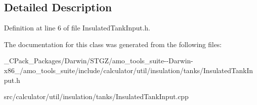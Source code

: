 \subsection{Detailed Description}


Definition at line 6 of file Insulated\+Tank\+Input.\+h.



The documentation for this class was generated from the following files\+:\begin{DoxyCompactItemize}
\item 
\+\_\+\+C\+Pack\+\_\+\+Packages/\+Darwin/\+S\+T\+G\+Z/amo\+\_\+tools\+\_\+suite-\/-\/\+Darwin-\/x86\+\_/amo\+\_\+tools\+\_\+suite/include/calculator/util/insulation/tanks/Insulated\+Tank\+Input.\+h\item 
src/calculator/util/insulation/tanks/Insulated\+Tank\+Input.\+cpp\end{DoxyCompactItemize}
